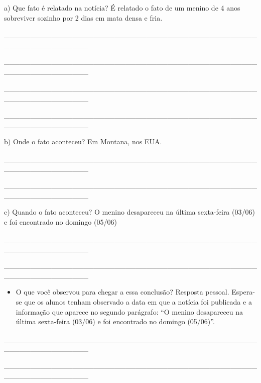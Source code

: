 \begin{itemize}
{{{\begin{itemize}
\begin{itemize}
\begin{itemize}
a) Que fato é relatado na notícia? É relatado o fato de um menino de 4
anos sobreviver sozinho por 2 dias em mata densa e fria.

\_\_\_\_\_\_\_\_\_\_\_\_\_\_\_\_\_\_\_\_\_\_\_\_\_\_\_\_\_\_\_\_\_\_\_\_\_\_\_\_\_\_\_\_\_\_\_\_\_\_\_\_\_\_\_\_\_\_\_\_\_\_\_\_

\_\_\_\_\_\_\_\_\_\_\_\_\_\_\_\_\_\_\_\_\_\_\_\_\_\_\_\_\_\_\_\_\_\_\_\_\_\_\_\_\_\_\_\_\_\_\_\_\_\_\_\_\_\_\_\_\_\_\_\_\_\_\_\_

\_\_\_\_\_\_\_\_\_\_\_\_\_\_\_\_\_\_\_\_\_\_\_\_\_\_\_\_\_\_\_\_\_\_\_\_\_\_\_\_\_\_\_\_\_\_\_\_\_\_\_\_\_\_\_\_\_\_\_\_\_\_\_\_

\_\_\_\_\_\_\_\_\_\_\_\_\_\_\_\_\_\_\_\_\_\_\_\_\_\_\_\_\_\_\_\_\_\_\_\_\_\_\_\_\_\_\_\_\_\_\_\_\_\_\_\_\_\_\_\_\_\_\_\_\_\_\_\_

b) Onde o fato aconteceu? Em Montana, nos EUA.

\_\_\_\_\_\_\_\_\_\_\_\_\_\_\_\_\_\_\_\_\_\_\_\_\_\_\_\_\_\_\_\_\_\_\_\_\_\_\_\_\_\_\_\_\_\_\_\_\_\_\_\_\_\_\_\_\_\_\_\_\_\_\_\_

\_\_\_\_\_\_\_\_\_\_\_\_\_\_\_\_\_\_\_\_\_\_\_\_\_\_\_\_\_\_\_\_\_\_\_\_\_\_\_\_\_\_\_\_\_\_\_\_\_\_\_\_\_\_\_\_\_\_\_\_\_\_\_\_

c) Quando o fato aconteceu? O menino desapareceu na última sexta-feira
(03/06) e foi encontrado no domingo (05/06)

\protect\hypertarget{_Hlk129099524}{}{}\_\_\_\_\_\_\_\_\_\_\_\_\_\_\_\_\_\_\_\_\_\_\_\_\_\_\_\_\_\_\_\_\_\_\_\_\_\_\_\_\_\_\_\_\_\_\_\_\_\_\_\_\_\_\_\_\_\_\_\_\_\_\_\_

\_\_\_\_\_\_\_\_\_\_\_\_\_\_\_\_\_\_\_\_\_\_\_\_\_\_\_\_\_\_\_\_\_\_\_\_\_\_\_\_\_\_\_\_\_\_\_\_\_\_\_\_\_\_\_\_\_\_\_\_\_\_\_\_

\begin{itemize}
\item
  O que você observou para chegar a essa conclusão? Resposta pessoal.
  Espera-se que os alunos tenham observado a data em que a notícia foi
  publicada e a informação que aparece no segundo parágrafo: ``O menino
  desapareceu na última sexta-feira (03/06) e foi encontrado no domingo
  (05/06)''.
\end{itemize}

\_\_\_\_\_\_\_\_\_\_\_\_\_\_\_\_\_\_\_\_\_\_\_\_\_\_\_\_\_\_\_\_\_\_\_\_\_\_\_\_\_\_\_\_\_\_\_\_\_\_\_\_\_\_\_\_\_\_\_\_\_\_\_\_

\_\_\_\_\_\_\_\_\_\_\_\_\_\_\_\_\_\_\_\_\_\_\_\_\_\_\_\_\_\_\_\_\_\_\_\_\_\_\_\_\_\_\_\_\_\_\_\_\_\_\_\_\_\_\_\_\_\_\_\_\_\_\_\_


\end{itemize}
\end{itemize}
\end{itemize}}}}
\end{itemize}
